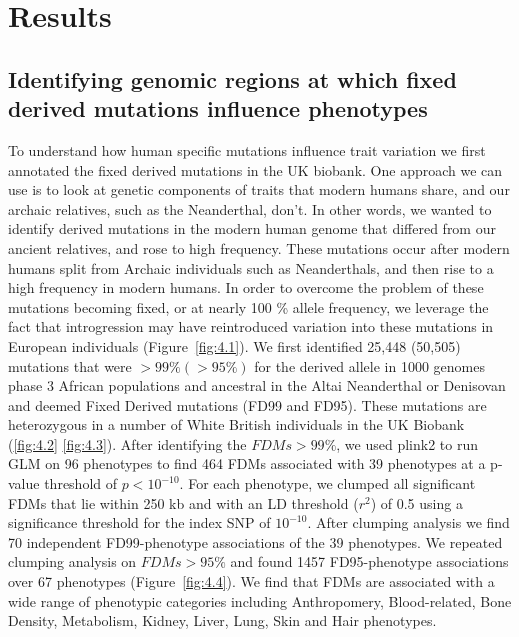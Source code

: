 \section{Results}
\subsection{Identifying genomic regions at which fixed derived mutations influence phenotypes}
To understand how human specific mutations influence trait variation we first annotated the fixed derived mutations in the UK biobank. One approach we can use is to look at genetic components of traits that modern humans share, and our archaic relatives, such as the Neanderthal, don’t. In other words, we wanted to identify derived mutations in the modern human genome that differed from our ancient relatives, and rose to high frequency. These mutations occur after modern humans split from Archaic individuals such as Neanderthals, and then rise to a high frequency in modern humans. In order to overcome the problem of these mutations becoming fixed, or at nearly 100 \% allele frequency, we leverage the fact that introgression may have reintroduced variation into these mutations in European individuals (Figure~\ref{fig:4.1}). We first identified  25,448 (50,505) mutations that were $>99\% (>95\%)$ for the derived allele in 1000 genomes phase 3 African populations and ancestral in the Altai Neanderthal or Denisovan and deemed Fixed Derived mutations (FD99 and FD95). These mutations are heterozygous in a number of White British individuals in the UK Biobank (\ref{fig:4.2} \ref{fig:4.3}). After identifying the $FDMs >99\%$, we used plink2 to run GLM on 96 phenotypes to find 464 FDMs associated with 39 phenotypes at a p-value threshold of $p<10^{-10}$.  For each phenotype, we clumped all significant FDMs that lie within 250 kb and with an LD threshold ($r^2$) of 0.5 using a significance threshold for the index SNP of $10^{-10}$. After clumping analysis we find 70 independent FD99-phenotype associations of the 39 phenotypes.
We repeated clumping analysis on $FDMs > 95\%$ and found 1457 FD95-phenotype associations over 67 phenotypes (Figure~\ref{fig:4.4}). We find that FDMs are associated with a wide range of phenotypic categories including Anthropomery, Blood-related, Bone Density, Metabolism, Kidney, Liver, Lung, Skin and Hair phenotypes. 
